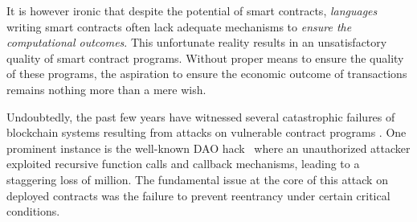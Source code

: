 It is however ironic that despite the potential of smart contracts,
\emph{languages} writing smart contracts often lack adequate mechanisms to \emph{ensure the
computational outcomes}. This unfortunate reality results in an unsatisfactory
quality of smart contract programs. Without proper means to ensure the quality
of these programs, the aspiration to ensure the economic outcome of
transactions remains nothing more than a mere wish.

Undoubtedly, the past few years have witnessed several catastrophic failures
of blockchain systems resulting from attacks on vulnerable contract programs \cite{DBLP:conf/icse/ZhangZXL23}.
One prominent instance is the well-known DAO hack~\cite{DAOhack} where an unauthorized
attacker exploited recursive function calls and callback mechanisms, leading
to a staggering loss of  million. The fundamental issue at the core of this
attack on deployed contracts was the failure to prevent reentrancy under certain 
critical conditions.



\iffalse
\begin{figure}[t]
\begin{lstlisting}[numbers=left,stepnumber=1,xleftmargin=1em,numberstyle=\ttfamily\color{gray},numbersep=3pt]
interface IERC20 {
  function transferFrom(address, address, unit);
}
contract Vault {
  address owner;
  constructor() { owner = msg.sender; }
  function deposit(address token, uint amount) public {
    require(msg.sender == owner);
    IERC20(token).transferFrom(msg.sender, 
      address(this), amount);
  }
}
\end{lstlisting}
\caption{A simplified example using addresses. \note{GW: this is an important example, mentioned in sec 1/2/3, should think about ways to improve}
\todo{GW: DAO?} \todo{GW: explain this with more details}
}
\label{fig:intro_example}
\end{figure}
\fi

